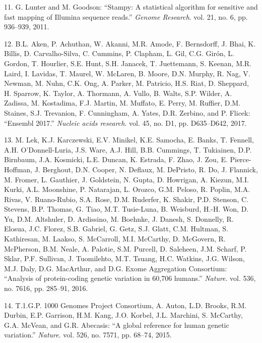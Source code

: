 \documentclass[12pt,twoside]{reedthesis}
\theoremstyle{definition}
\theoremstyle{definition}
\theoremstyle{remark}
\begin{document}
  \hypertarget{ref-Lunter2011}{}
  11. G. Lunter and M. Goodson: ``Stampy: A statistical algorithm for
  sensitive and fast mapping of Illumina sequence reads.'' \emph{Genome
  Research}. vol. 21, no. 6, pp. 936--939, 2011.
  
  \hypertarget{ref-Aken2017}{}
  12. B.L. Aken, P. Achuthan, W. Akanni, M.R. Amode, F. Bernsdorff, J.
  Bhai, K. Billis, D. Carvalho-Silva, C. Cummins, P. Clapham, L. Gil, C.G.
  Girón, L. Gordon, T. Hourlier, S.E. Hunt, S.H. Janacek, T. Juettemann,
  S. Keenan, M.R. Laird, I. Lavidas, T. Maurel, W. McLaren, B. Moore, D.N.
  Murphy, R. Nag, V. Newman, M. Nuhn, C.K. Ong, A. Parker, M. Patricio,
  H.S. Riat, D. Sheppard, H. Sparrow, K. Taylor, A. Thormann, A. Vullo, B.
  Walts, S.P. Wilder, A. Zadissa, M. Kostadima, F.J. Martin, M. Muffato,
  E. Perry, M. Ruffier, D.M. Staines, S.J. Trevanion, F. Cunningham, A.
  Yates, D.R. Zerbino, and P. Flicek: ``Ensembl 2017.'' \emph{Nucleic
  acids research}. vol. 45, no. D1, pp. D635--D642, 2017.
  
  \hypertarget{ref-Lek2016}{}
  13. M. Lek, K.J. Karczewski, E.V. Minikel, K.E. Samocha, E. Banks, T.
  Fennell, A.H. O'Donnell-Luria, J.S. Ware, A.J. Hill, B.B. Cummings, T.
  Tukiainen, D.P. Birnbaum, J.A. Kosmicki, L.E. Duncan, K. Estrada, F.
  Zhao, J. Zou, E. Pierce-Hoffman, J. Berghout, D.N. Cooper, N. Deflaux,
  M. DePristo, R. Do, J. Flannick, M. Fromer, L. Gauthier, J. Goldstein,
  N. Gupta, D. Howrigan, A. Kiezun, M.I. Kurki, A.L. Moonshine, P.
  Natarajan, L. Orozco, G.M. Peloso, R. Poplin, M.A. Rivas, V.
  Ruano-Rubio, S.A. Rose, D.M. Ruderfer, K. Shakir, P.D. Stenson, C.
  Stevens, B.P. Thomas, G. Tiao, M.T. Tusie-Luna, B. Weisburd, H.-H. Won,
  D. Yu, D.M. Altshuler, D. Ardissino, M. Boehnke, J. Danesh, S. Donnelly,
  R. Elosua, J.C. Florez, S.B. Gabriel, G. Getz, S.J. Glatt, C.M. Hultman,
  S. Kathiresan, M. Laakso, S. McCarroll, M.I. McCarthy, D. McGovern, R.
  McPherson, B.M. Neale, A. Palotie, S.M. Purcell, D. Saleheen, J.M.
  Scharf, P. Sklar, P.F. Sullivan, J. Tuomilehto, M.T. Tsuang, H.C.
  Watkins, J.G. Wilson, M.J. Daly, D.G. MacArthur, and D.G. Exome
  Aggregation Consortium: ``Analysis of protein-coding genetic variation
  in 60,706 humans.'' \emph{Nature}. vol. 536, no. 7616, pp. 285--91,
  2016.
  
  \hypertarget{ref-1000GenomesProjectConsortium2015}{}
  14. T.1.G.P. 1000 Genomes Project Consortium, A. Auton, L.D. Brooks,
  R.M. Durbin, E.P. Garrison, H.M. Kang, J.O. Korbel, J.L. Marchini, S.
  McCarthy, G.A. McVean, and G.R. Abecasis: ``A global reference for human
  genetic variation.'' \emph{Nature}. vol. 526, no. 7571, pp. 68--74,
  2015.
  
\end{document}
